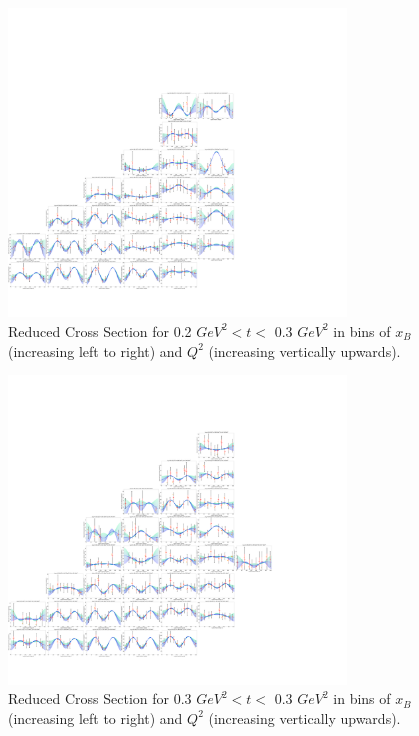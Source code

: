     \begin{figure}[ht]
        \centering
        \includegraphics[trim={14.6cm 4cm 27.2cm 4cm},clip,width=0.8\textwidth]{Chapters/Ch5-Further/c12xsec/combined_t0.2.png}
        \caption[Reduced Cross Section for 0.2 $GeV^2 < t <$ 0.3 $ GeV^2$]{Reduced Cross Section for 0.2 $ GeV^2 < t <$ 0.3 $GeV^2$ in bins of $x_B$ (increasing left to right) and $Q^2$ (increasing vertically upwards). }
        \label{fig:combined_t0.2}
    \end{figure}

    \begin{figure}[ht]
        \centering
        \includegraphics[trim={14.6cm 4cm 27.2cm 4cm},clip,width=0.8\textwidth]{Chapters/Ch5-Further/c12xsec/combined_t0.3.png}
        \caption[Reduced Cross Section for 0.3 $GeV^2 < t <$ 0.4 $ GeV^2$]{Reduced Cross Section for 0.3 $ GeV^2 < t <$ 0.3 $GeV^2$ in bins of $x_B$ (increasing left to right) and $Q^2$ (increasing vertically upwards). }
        \label{fig:combined_t0.3}
    \end{figure}

